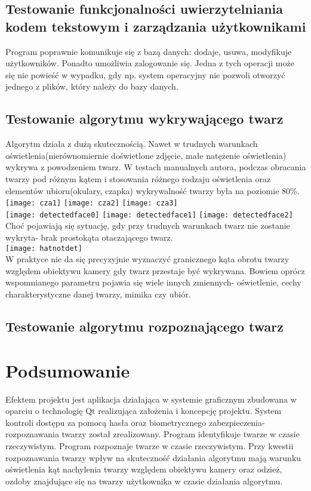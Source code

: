 \documentclass[eng,printmode]{mgr}
\begin{document}
\section{Testowanie funkcjonalności uwierzytelniania kodem tekstowym i zarządzania użytkownikami}
Program poprawnie komunikuje się z bazą danych: dodaje, usuwa, modyfikuje użytkowników. Ponadto umożliwia zalogowanie się. Jedna z tych operacji może się nie powieść w wypadku, gdy np. system operacyjny nie pozwoli otworzyć jednego z plików, który należy do bazy danych.

\section{Testowanie algorytmu wykrywającego twarz}
Algorytm działa z dużą skutecznością. Nawet w trudnych warunkach oświetlenia(nierównomiernie doświetlone zdjęcie, małe natężenie oświetlenia) wykrywa z powodzeniem twarz. W testach manualnych autora, podczas obracania twarzy pod różnym kątem i stosowania różnego rodzaju oświetlenia oraz elementów ubioru(okulary, czapka) wykrywalność twarzy była na poziomie 80\%.\\
\texttt{[image: cza1]}
\texttt{[image: cza2]}
\texttt{[image: cza3]}\\
\texttt{[image: detectedface0]}
\texttt{[image: detectedface1]}
\texttt{[image: detectedface2]}\\

Choć pojawiają się sytuację, gdy przy trudnych warunkach twarz nie zostanie wykryta- brak prostokąta otaczającego twarz.\\
\texttt{[image: hatnotdet]}\\

W praktyce nie da się precyzyjnie wyznaczyć granicznego kąta obrotu twarzy względem obiektywu kamery gdy twarz przestaje być wykrywana. Bowiem oprócz wspomnianego parametru pojawia się wiele innych zmiennych- oświetlenie, cechy charakterystyczne danej twarzy, mimika czy ubiór.

\section{Testowanie algorytmu rozpoznającego twarz}
\chapter{Podsumowanie}
Efektem projektu jest aplikacja działająca w systemie graficznym zbudowana w oparciu o technologię Qt realizująca założenia i koncepcję projektu. System kontroli dostępu za pomocą hasła oraz biometrycznego zabezpieczenia- rozpoznawania twarzy został zrealizowany. Program identyfikuje twarze w czasie rzeczywistym. Program rozpoznaje twarze w czasie rzeczywistym. Przy kwestii rozpoznawania twarzy wpływ na skuteczność działania algorytmu mają warunku oświetlenia kąt nachylenia twarzy względem obiektywu kamery oraz odzież, ozdoby znajdujące się na twarzy użytkownika w czasie działania algorytmu.
\end{document}
